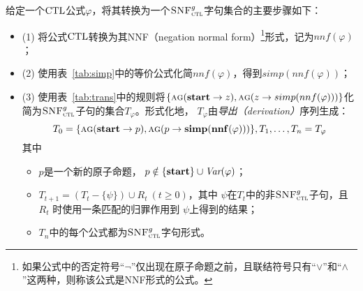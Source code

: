 给定一个$\textrm{CTL}$公式$\varphi$，将其转换为一个${\textsc{SNF}_{\textsc{ctl}}^g}$字句集合的主要步骤如下：
\begin{itemize}
	\item[] (1) 将公式$\textrm{CTL}$转换为其NNF（negation normal form）\footnote{如果公式中的否定符号“$\neg$”仅出现在原子命题之前，且联结符号只有“$\vee$”和“$\wedge$”这两种，则称该公式是NNF形式的公式。}形式，记为$nnf(\varphi)$；
	\item[] (2) 使用表~\ref{tab:simp}中的等价公式化简$nnf(\varphi)$，得到$simp(nnf(\varphi))$；
	\item[] (3) 使用表~\ref{tab:trans}中的规则将$\{\textsc{a}\textsc{g}(\textbf{start}\rightarrow z), \textsc{a}\textsc{g}(z \rightarrow simp(nnf(\varphi)))\}$化简为${\textsc{SNF}_{\textsc{ctl}}^g}$子句的集合$T_{\varphi}$。形式化地，
	$T_\varphi$由\emph{导出（derivation）}序列生成：
	\[ T_0=\{\textsc{a}\textsc{g}(\textbf{start}\rightarrow p), \textsc{a}\textsc{g}(p\rightarrow {\bf simp}({\bf nnf}(\varphi)))\}, T_1, \ldots, T_n=T_\varphi\]
	其中
	\begin{itemize}
		\item $p$是一个新的原子命题， \ie $p\notin \{\textbf{start}\}\cup\textit{Var}(\varphi)$；
		\item $T_{t+1} = (T_t - \{\psi\}) \cup R_t~(t\ge 0)$，其中 $\psi$在$T_t$中的非${\textsc{SNF}_{\textsc{ctl}}^g}$子句，且 $R_t$
	时使用一条匹配的归罪作用到 $\psi$上得到的结果；
		\item  $T_n$中的每个公式都为${\textsc{SNF}_{\textsc{ctl}}^g}$字句形式。
	\end{itemize}
\end{itemize}


